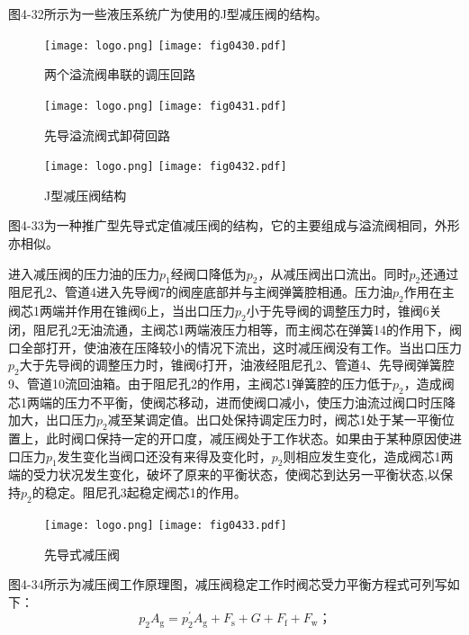 图4-32所示为一些液压系统广为使用的J型减压阀的结构。

\begin{figure}[!hbt]
\centering
\ifOpenSource
\texttt{[image: logo.png]}
\else
\texttt{[image: fig0430.pdf]}
\fi
\caption{两个溢流阀串联的调压回路}
\label{fig:fig0430}
\end{figure}

\begin{figure}[!hbt]
\centering
\ifOpenSource
\texttt{[image: logo.png]}
\else
\texttt{[image: fig0431.pdf]}
\fi
\caption{先导溢流阀式卸荷回路}
\label{fig:fig0431}
\end{figure}

\begin{figure}[!hbt]
\centering
\ifOpenSource
\texttt{[image: logo.png]}
\else
\texttt{[image: fig0432.pdf]}
\fi
\caption{J型减压阀结构}
\label{fig:fig0432}
\end{figure}

图4-33为一种推广型先导式定值减压阀的结构，它的主要组成与溢流阀相同，外形亦相似。

进入减压阀的压力油的压力$p_{1}$经阀口降低为$p_{2}$，从减压阀出口流出。同时$p_{2}$还通过阻尼孔2、管道4进入先导阀7的阀座底部并与主阀弹簧腔相通。压力油$p_{2}$作用在主阀芯1两端并作用在锥阀6上，当出口压力$p_{2}$小于先导阀的调整压力时，锥阀6关闭，阻尼孔2无油流通，主阀芯1两端液压力相等，而主阀芯在弹簧14的作用下，阀口全部打开，使油液在压降较小的情况下流出，这时减压阀没有工作。当出口压力$p_{2}$大于先导阀的调整压力时，锥阀6打开，油液经阻尼孔2、管道4、先导阀弹簧腔9、管道10流回油箱。由于阻尼孔2的作用，主阀芯1弹簧腔的压力低于$p_{2}$，造成阀芯1两端的压力不平衡，使阀芯移动，进而使阀口减小，使压力油流过阀口时压降加大，出口压力$p_{2}$减至某调定值。出口处保持调定压力时，阀芯1处于某一平衡位置上，此时阀口保持一定的开口度，减压阀处于工作状态。如果由于某种原因使进口压力$p_{1}$发生变化当阀口还没有来得及变化时，$p_{2}$则相应发生变化，造成阀芯1两端的受力状况发生变化，破坏了原来的平衡状态，使阀芯到达另一平衡状态,以保持$p_{2}$的稳定。阻尼孔3起稳定阀芯1的作用。

\begin{figure}[!hbt]
\centering
\ifOpenSource
\texttt{[image: logo.png]}
\else
\texttt{[image: fig0433.pdf]}
\fi
\caption{先导式减压阀}
\label{fig:fig0433}
\end{figure}

图4-34所示为减压阀工作原理图，减压阀稳定工作时阀芯受力平衡方程式可列写如下：
\begin{equation}
p_{2}A_\text{g}=p^{'}_{2}A_\text{g}+F_\text{s}+G+F_\text{f}+F_\text{w}；
\end{equation}

